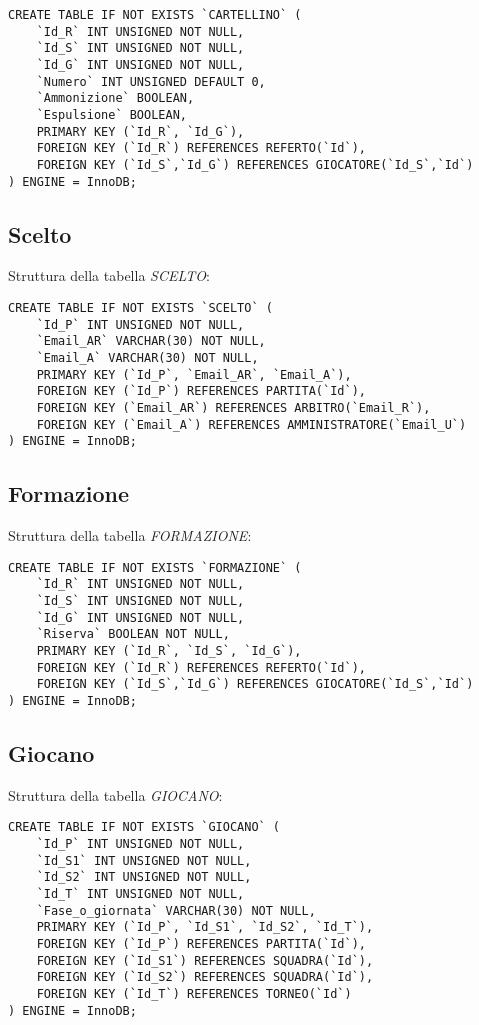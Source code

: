 \begin{lstlisting}
CREATE TABLE IF NOT EXISTS `CARTELLINO` (
	`Id_R` INT UNSIGNED NOT NULL,
	`Id_S` INT UNSIGNED NOT NULL,
	`Id_G` INT UNSIGNED NOT NULL,
	`Numero` INT UNSIGNED DEFAULT 0,
	`Ammonizione` BOOLEAN,
	`Espulsione` BOOLEAN,
	PRIMARY KEY (`Id_R`, `Id_G`),
	FOREIGN KEY (`Id_R`) REFERENCES REFERTO(`Id`),
	FOREIGN KEY (`Id_S`,`Id_G`) REFERENCES GIOCATORE(`Id_S`,`Id`)
) ENGINE = InnoDB;
\end{lstlisting}

\newpage

\subsection{Scelto}
Struttura della tabella \emph{SCELTO}:

\begin{lstlisting}
CREATE TABLE IF NOT EXISTS `SCELTO` (
	`Id_P` INT UNSIGNED NOT NULL,
	`Email_AR` VARCHAR(30) NOT NULL,
	`Email_A` VARCHAR(30) NOT NULL,
	PRIMARY KEY (`Id_P`, `Email_AR`, `Email_A`),
	FOREIGN KEY (`Id_P`) REFERENCES PARTITA(`Id`),
	FOREIGN KEY (`Email_AR`) REFERENCES ARBITRO(`Email_R`),
	FOREIGN KEY (`Email_A`) REFERENCES AMMINISTRATORE(`Email_U`)
) ENGINE = InnoDB;
\end{lstlisting}

\subsection{Formazione}
Struttura della tabella \emph{FORMAZIONE}:

\begin{lstlisting}
CREATE TABLE IF NOT EXISTS `FORMAZIONE` (
	`Id_R` INT UNSIGNED NOT NULL,
	`Id_S` INT UNSIGNED NOT NULL,
	`Id_G` INT UNSIGNED NOT NULL,
	`Riserva` BOOLEAN NOT NULL,
	PRIMARY KEY (`Id_R`, `Id_S`, `Id_G`),
	FOREIGN KEY (`Id_R`) REFERENCES REFERTO(`Id`),
	FOREIGN KEY (`Id_S`,`Id_G`) REFERENCES GIOCATORE(`Id_S`,`Id`)
) ENGINE = InnoDB;
\end{lstlisting}

\subsection{Giocano}
Struttura della tabella \emph{GIOCANO}:

\begin{lstlisting}
CREATE TABLE IF NOT EXISTS `GIOCANO` (
	`Id_P` INT UNSIGNED NOT NULL,
	`Id_S1` INT UNSIGNED NOT NULL,
	`Id_S2` INT UNSIGNED NOT NULL,
	`Id_T` INT UNSIGNED NOT NULL,
	`Fase_o_giornata` VARCHAR(30) NOT NULL,
	PRIMARY KEY (`Id_P`, `Id_S1`, `Id_S2`, `Id_T`),
	FOREIGN KEY (`Id_P`) REFERENCES PARTITA(`Id`),
	FOREIGN KEY (`Id_S1`) REFERENCES SQUADRA(`Id`),
	FOREIGN KEY (`Id_S2`) REFERENCES SQUADRA(`Id`),
	FOREIGN KEY (`Id_T`) REFERENCES TORNEO(`Id`)
) ENGINE = InnoDB;
\end{lstlisting}

